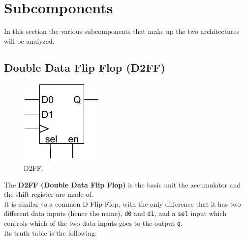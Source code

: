 \section{Subcomponents}\label{sec:subcomponents}
In this section the various subcomponents that make up the two architectures will be analyzed.

\subsection{Double Data Flip Flop (D2FF)}\label{subsec:d2ff}

\begin{figure}[H]
    \begin{center}
        \includegraphics[scale=1.3,clip]{img/DFF_block.pdf}
    \end{center}
    \vspace*{-0.5cm}
    \caption{D2FF.}
    \label{fig:DFF_block}
\end{figure}

The \textbf{D2FF (Double Data Flip Flop)} is the basic unit the accumulator and the shift register are made of.\\
It is similar to a common D Flip-Flop, with the only difference that it has two different data inputs (hence the name), \texttt{d0} and \texttt{d1}, and a \texttt{sel} input which controls which of the two data inputs goes to the output \texttt{q}.\\
Its truth table is the following:\\

